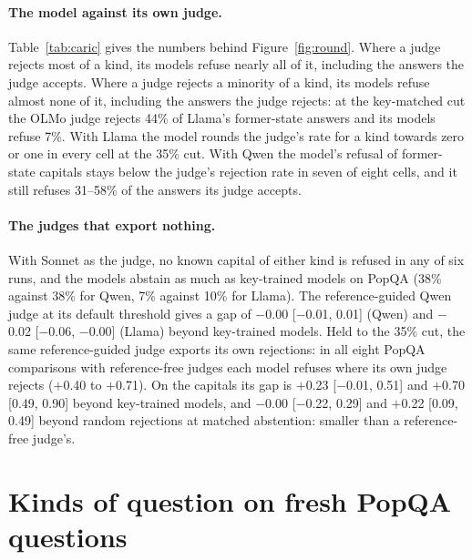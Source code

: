 \paragraph{The model against its own judge.} Table~\ref{tab:caric} gives the numbers behind Figure~\ref{fig:round}. Where a judge rejects most of a kind, its models refuse nearly all of it, including the answers the judge accepts. Where a judge rejects a minority of a kind, its models refuse almost none of it, including the answers the judge rejects: at the key-matched cut the OLMo judge rejects 44\% of Llama's former-state answers and its models refuse 7\%. With Llama the model rounds the judge's rate for a kind towards zero or one in every cell at the 35\% cut. With Qwen the model's refusal of former-state capitals stays below the judge's rejection rate in seven of eight cells, and it still refuses 31--58\% of the answers its judge accepts.

\paragraph{The judges that export nothing.} With Sonnet as the judge, no known capital of either kind is refused in any of six runs, and the models abstain as much as key-trained models on PopQA (38\% against 38\% for Qwen, 7\% against 10\% for Llama). The reference-guided Qwen judge at its default threshold gives a gap of $-$0.00 [$-$0.01, 0.01] (Qwen) and $-$0.02 [$-$0.06, $-$0.00] (Llama) beyond key-trained models. Held to the 35\% cut, the same reference-guided judge exports its own rejections: in all eight PopQA comparisons with reference-free judges each model refuses where its own judge rejects ($+$0.40 to $+$0.71). On the capitals its gap is $+$0.23 [$-$0.01, 0.51] and $+$0.70 [0.49, 0.90] beyond key-trained models, and $-$0.00 [$-$0.22, 0.29] and $+$0.22 [0.09, 0.49] beyond random rejections at matched abstention: smaller than a reference-free judge's.

\section{Kinds of question on fresh PopQA questions}
\label{app:kinds}

